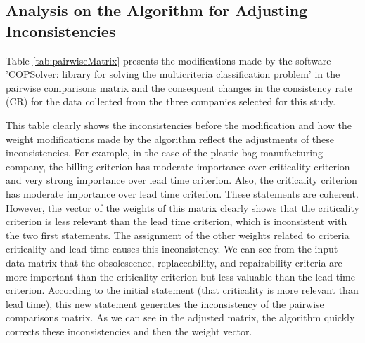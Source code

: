 \documentclass[10pt,fleqn,a4paper,twoside]{article}
\begin{document}
    \subsection{Analysis on the Algorithm for Adjusting Inconsistencies}
    
    Table \ref{tab:pairwiseMatrix} presents the modifications made by the software 'COPSolver: library for solving the multicriteria classification problem' in the pairwise comparisons matrix and the consequent changes in the consistency rate (CR) for the data collected from the three companies selected for this study.
    
    This table clearly shows the inconsistencies before the modification and how the weight modifications made by the algorithm reflect the adjustments of these inconsistencies. For example, in the case of the plastic bag manufacturing company, the billing criterion has moderate importance over criticality criterion and very strong importance over lead time criterion. Also, the criticality criterion has moderate importance over lead time criterion. These statements are coherent. However, the vector of the weights of this matrix clearly shows that the criticality criterion is less relevant than the lead time criterion, which is inconsistent with the two first statements. The assignment of the other weights related to criteria criticality and lead time causes this inconsistency. We can see from the input data matrix that the obsolescence, replaceability, and repairability criteria are more important than the criticality criterion but less valuable than the lead-time criterion. According to the initial statement (that criticality is more relevant than lead time), this new statement generates the inconsistency of the pairwise comparisons matrix. As we can see in the adjusted matrix, the algorithm quickly corrects these inconsistencies and then the weight vector.
\end{document}
